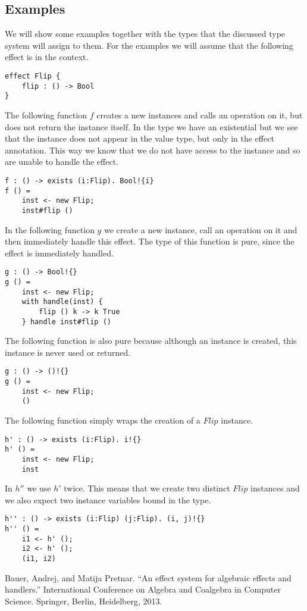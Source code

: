 \documentclass[12pt]{article}
\begin{document}
\subsection{Examples}
We will show some examples together with the types that the discussed type system will assign to them.
For the examples we will assume that the following effect is in the context.
\begin{verbatim}
effect Flip {
	flip : () -> Bool
}
\end{verbatim}

The following function $f$ creates a new instances and calls an operation on it, but does not return the instance itself.
In the type we have an existential but we see that the instance does not appear in the value type, but only in the effect annotation. This way we know that we do not have access to the instance and so are unable to handle the effect.
\begin{verbatim}
f : () -> exists (i:Flip). Bool!{i}
f () =
	inst <- new Flip;
	inst#flip ()
\end{verbatim}

\newpage
In the following function $g$ we create a new instance, call an operation on it and then immediately handle this effect.
The type of this function is pure, since the effect is immediately handled.
\begin{verbatim}
g : () -> Bool!{}
g () =
	inst <- new Flip;
	with handle(inst) {
		flip () k -> k True
	} handle inst#flip ()
\end{verbatim}

The following function is also pure because although an instance is created, this instance is never used or returned.
\begin{verbatim}
g : () -> ()!{}
g () =
	inst <- new Flip;
	()
\end{verbatim}

The following function simply wraps the creation of a $Flip$ instance.
\begin{verbatim}
h' : () -> exists (i:Flip). i!{}
h' () =
	inst <- new Flip;
	inst
\end{verbatim}

In $h''$ we use $h'$ twice. This means that we create two distinct $Flip$ instances and we also expect two instance variables bound in the type.
\begin{verbatim}
h'' : () -> exists (i:Flip) (j:Flip). (i, j)!{}
h'' () =
	i1 <- h' ();
	i2 <- h' ();
	(i1, i2)
\end{verbatim}

\begin{thebibliography}{9}
Bauer, Andrej, and Matija Pretnar. ``An effect system for algebraic effects and handlers.'' International Conference on Algebra and Coalgebra in Computer Science. Springer, Berlin, Heidelberg, 2013.
\end{thebibliography}
\end{document}
